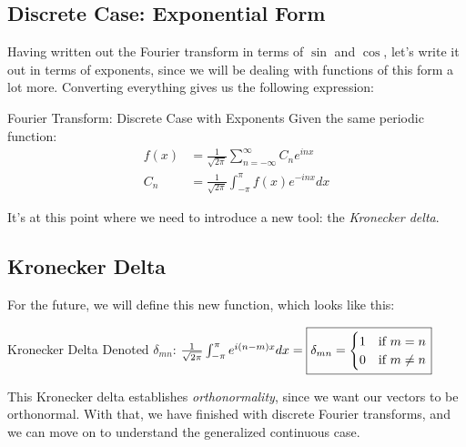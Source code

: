       \subsection{Discrete Case: Exponential Form}
        Having written out the Fourier transform in terms of $\sin$ and $\cos$, let's write it out in terms of exponents, since we will be dealing with functions of this form a lot more. Converting everything gives us the following expression:
        \begin{definition}{Fourier Transform: Discrete Case with Exponents}{}
          Given the same periodic function:
          \begin{align*}
            f(x) &= \frac{1}{\sqrt{2\pi}}\sum_{n=-\infty}^{\infty}C_ne^{inx}\\
            C_n &= \frac{1}{\sqrt{2\pi}}\int_{-\pi}^{\pi}f(x)e^{-inx}dx
          \end{align*}
        \end{definition}
        It's at this point where we need to introduce a new tool: the \textit{Kronecker delta}.

      \subsection{Kronecker Delta}
        For the future, we will define this new function, which looks like this:
        \begin{definition}{Kronecker Delta}{}
          Denoted $\delta_{mn}$: $\frac{1}{\sqrt{2\pi}}\int_{-\pi}^{\pi}e^{i(n-m)x}dx = \fbox{$\delta_{mn} = \begin{cases}1 & \text{if } m = n\\ 0 & \text{if } m \neq n\end{cases}$}$
        \end{definition}
        This Kronecker delta establishes \textit{orthonormality}, since we want our vectors to be orthonormal. With that, we have finished with discrete Fourier transforms, and we can move on to understand the generalized continuous case.

